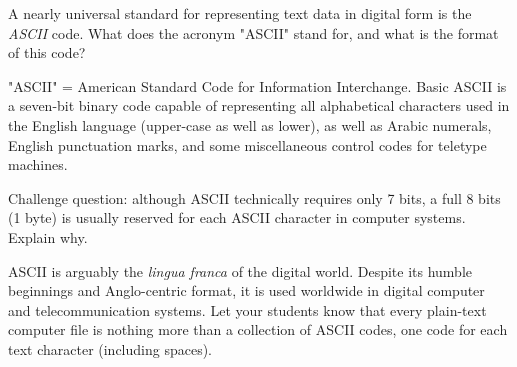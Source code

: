 

A nearly universal standard for representing text data in digital form is the {\it ASCII} code.  What does the acronym "ASCII" stand for, and what is the format of this code?







"ASCII" = American Standard Code for Information Interchange.  Basic ASCII is a seven-bit binary code capable of representing all alphabetical characters used in the English language (upper-case as well as lower), as well as Arabic numerals, English punctuation marks, and some miscellaneous control codes for teletype machines.

\vskip 10pt

Challenge question: although ASCII technically requires only 7 bits, a full 8 bits (1 byte) is usually reserved for each ASCII character in computer systems.  Explain why.







ASCII is arguably the {\it lingua franca} of the digital world.  Despite its humble beginnings and Anglo-centric format, it is used worldwide in digital computer and telecommunication systems.  Let your students know that every plain-text computer file is nothing more than a collection of ASCII codes, one code for each text character (including spaces).




